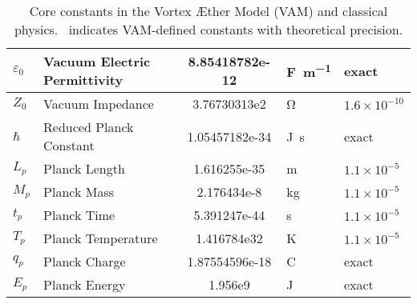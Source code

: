 \begin{table}[H]
\begin{tabular}{|l|l|S[scientific-notation = true] |l|l|}
        $\varepsilon_0$ & Vacuum Electric Permittivity & 8.85418782e-12 & \si{\farad\per\meter} & exact \\ \hline
        $Z_0$ & Vacuum Impedance & 3.76730313e2 & \si{\ohm} & $1.6 \times 10^{-10}$ \\ \hline
        $\hbar$ & Reduced Planck Constant & 1.05457182e-34 & \si{\joule\second} & exact \\ \hline
        $L_p$ & Planck Length & 1.616255e-35 & \si{\meter} & $1.1 \times 10^{-5}$ \\ \hline
        $M_p$ & Planck Mass & 2.176434e-8 & \si{\kilogram} & $1.1 \times 10^{-5}$ \\ \hline
        $t_p$ & Planck Time & 5.391247e-44 & \si{\second} & $1.1 \times 10^{-5}$ \\ \hline
        $T_p$ & Planck Temperature & 1.416784e32 & \si{\kelvin} & $1.1 \times 10^{-5}$ \\ \hline
        $q_p$ & Planck Charge & 1.87554596e-18 & \si{\coulomb} & exact \\ \hline
        $E_p$ & Planck Energy & 1.956e9 & \si{\joule} & exact \\ \hline
    \end{tabular}
    \caption{Core constants in the Vortex Æther Model (VAM) and classical physics. \textdagger\ indicates VAM-defined constants with theoretical precision.}
    \label{tab:vam_core_constants}
\end{table}


